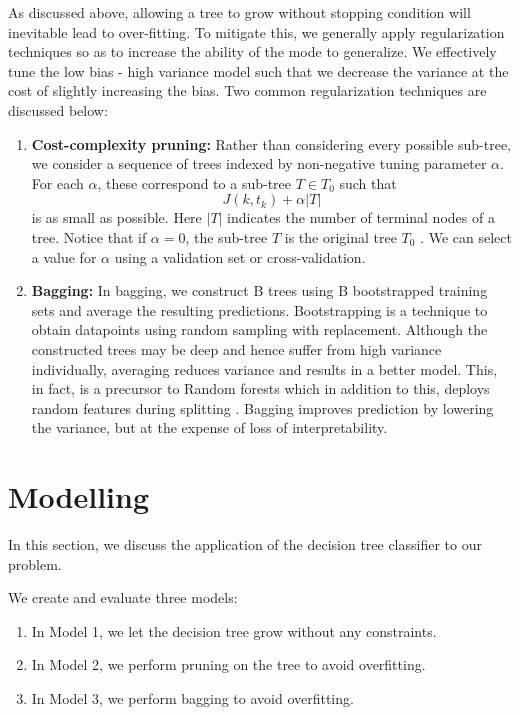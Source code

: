 \documentclass[conference]{IEEEtran}
\begin{document}
As discussed above, allowing a tree to grow without stopping condition will inevitable lead to over-fitting. To mitigate this, we generally apply regularization techniques so as to increase the ability of the mode to generalize. We effectively tune the low bias - high variance model such that we decrease the variance at the cost of slightly increasing the bias. Two common regularization techniques are discussed below:

\begin{enumerate}
    \item \textbf{Cost-complexity pruning:} Rather than considering every possible sub-tree, we consider a sequence of trees indexed by non-negative tuning parameter $\alpha$. For each $\alpha$, these correspond to a sub-tree $T \in T_0$ such that $$ J(k, t_k) + {\alpha}|T| $$ is as small as possible. Here $|T|$ indicates the number of terminal nodes of a tree. Notice that if $\alpha = 0$, the sub-tree $T$ is the original tree $T_0$ . We can select a value for $\alpha$ using a validation set or cross-validation.
    \item \textbf{Bagging:} In bagging, we construct B trees using B bootstrapped training sets and average the resulting predictions. Bootstrapping is a technique to obtain datapoints using random sampling with replacement. Although the constructed trees may be deep and hence suffer from high variance individually, averaging reduces variance and results in a better model. This, in fact, is a precursor to Random forests which in addition to this, deploys random features during splitting . Bagging improves prediction by lowering the variance, but at the expense of loss of interpretability.
\end{enumerate}



\section{Modelling }

In this section, we discuss the application of the decision tree classifier to our problem. 

We create and evaluate three models:

\begin{enumerate}
    \item In Model 1, we let the decision tree grow without any constraints.
    \item In Model 2, we perform pruning on the tree to avoid overfitting.
    \item In Model 3, we perform bagging to avoid overfitting.
\end{enumerate}
\end{document}
